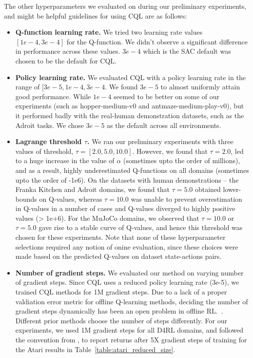 The other hyperparameters we evaluated on during our preliminary experiments, and might be helpful guidelines for using CQL are as follows:
\begin{itemize}
    \item \textbf{Q-function learning rate.} We tried two learning rate values $[1e-4, 3e-4]$ for the Q-function. We didn't observe a significant difference in performance across these values. $3e-4$ which is the SAC default was chosen to be the default for CQL.
    \item \textbf{Policy learning rate.} We evaluated CQL with a policy learning rate in the range of $[3e-5, 1e-4, 3e-4$. We found $3e-5$ to almost uniformly attain good performance. While $1e-4$ seemed to be better on some of our experiments (such as hopper-medium-v0 and antmaze-medium-play-v0), but it performed badly with the real-human demonstration datasets, such as the Adroit tasks. We chose $3e-5$ as the default across all environments.
    \item \textbf{Lagrange threshold $\tau$.} We ran our preliminary experiments with three values of threshold, $\tau = [2.0, 5.0, 10.0]$. However, we found that $\tau=2.0$, led to a huge increase in the value of $\alpha$ (sometimes upto the order of millions), and as a result, highly underestimated Q-functions on all domains (sometimes upto the order of -1e6). On the datasets with human demonstrations -- the Franka Kitchen and Adroit domains, we found that $\tau=5.0$ obtained lower-bounds on Q-values, whereas $\tau=10.0$ was unable to prevent overestimation in Q-values in a number of cases and Q-values diverged to highly positive values (> 1e+6). For the MuJoCo domains, we observed that $\tau=10.0$ or $\tau=5.0$ gave rise to a stable curve of Q-values, and hence this threshold was chosen for these experiments. Note that none of these hyperparameter selections required any notion of onine evaluation, since these choices were made based on the predicted Q-values on dataset state-actions pairs.  
    \item \textbf{Number of gradient steps.} We evaluated our method on varying number of gradient steps. Since CQL uses a reduced policy learning rate (3e-5), we trained CQL methods for 1M gradient steps. Due to a lack of a proper valdiation error metric for offline Q-learning methods, deciding the number of gradient steps dynamically has been an open problem in offline RL.~\citep{levine2020offline}. Different prior methods choose the number of steps differently. For our experiments, we used 1M gradient steps for all D4RL domains, and followed the convention from \citet{agarwal2019optimistic}, to report returns after 5X gradient steps of training for the Atari results in Table~\ref{table:atari_reduced_size}.  

\end{itemize}
